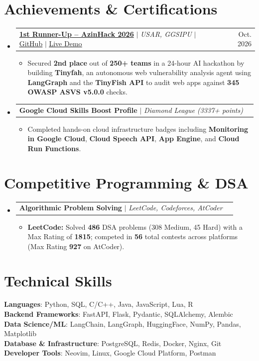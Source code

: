 \documentclass[letterpaper,11pt]{article}
\makeatletter
\newcommand{\resumeItem}[1]{
  \item\small{
    {#1 \vspace{-3pt}}
  }
}
\newcommand{\resumeProjectHeading}[2]{
    \item
    \begin{tabular*}{0.97\textwidth}{l@{\extracolsep{\fill}}r}
      \small#1 & #2 \\
    \end{tabular*}\vspace{-7pt}
}
\newcommand{\resumeSubHeadingListStart}{\begin{itemize}[leftmargin=0.15in, label={}]}
\newcommand{\resumeSubHeadingListEnd}{\end{itemize}}
\newcommand{\resumeItemListStart}{\begin{itemize}}
\newcommand{\resumeItemListEnd}{\end{itemize}\vspace{-6pt}}
\makeatother
\begin{document}
\section{Achievements \& Certifications}
\resumeSubHeadingListStart
\resumeProjectHeading
{\href{https://unstop.com/hackathons/azinhack-2026-university-school-of-automation-robotics-usar-guru-gobind-singh-indraprastha-university-ggsipu--1763832}{\textbf{1st Runner-Up -- AzinHack 2026}} $|$ \emph{USAR, GGSIPU} $|$ \href{https://github.com/Yashvardhan0904/Tinyfah}{\underline{GitHub}} $|$ \href{https://tinyfah.vercel.app/}{\underline{Live Demo}}}{Oct. 2026}
\resumeItemListStart
\resumeItem{Secured \textbf{2nd place} out of \textbf{250+ teams} in a 24-hour AI hackathon by building \textbf{Tinyfah}, an autonomous web vulnerability analysis agent using \textbf{LangGraph} and the \textbf{TinyFish API} to audit web apps against \textbf{345 OWASP ASVS v5.0.0} checks.}
\resumeItemListEnd
\resumeProjectHeading
{\textbf{Google Cloud Skills Boost Profile} $|$ \emph{Diamond League (3337+ points)}}{}
\resumeItemListStart
\resumeItem{Completed hands-on cloud infrastructure badges including \textbf{Monitoring in Google Cloud}, \textbf{Cloud Speech API}, \textbf{App Engine}, and \textbf{Cloud Run Functions}.}
\resumeItemListEnd
\resumeSubHeadingListEnd
\vspace{-14pt}

\section{Competitive Programming \& DSA}
\resumeSubHeadingListStart
\resumeProjectHeading
{\textbf{Algorithmic Problem Solving} $|$ \emph{LeetCode, Codeforces, AtCoder}}{}
\resumeItemListStart
\resumeItem{\textbf{LeetCode:} Solved \textbf{486} DSA problems (308 Medium, 45 Hard) with a Max Rating of \textbf{1815}; competed in \textbf{56} total contests across platforms (Max Rating \textbf{927} on AtCoder).}
\resumeItemListEnd
\resumeSubHeadingListEnd
\vspace{-14pt}

\section{Technical Skills}
\begin{itemize}[leftmargin=0.15in, label={}]
	\small{\item{
	      \textbf{Languages}{: Python, SQL, C/C++, Java, JavaScript, Lua, R} \\
	      \textbf{Backend Frameworks}{: FastAPI, Flask, Pydantic, SQLAlchemy, Alembic} \\
	      \textbf{Data Science/ML}{: LangChain, LangGraph, HuggingFace, NumPy, Pandas, Matplotlib} \\
	      \textbf{Database \& Infrastructure}{: PostgreSQL, Redis, Docker, Nginx, Git} \\
	      \textbf{Developer Tools}{: Neovim, Linux, Google Cloud Platform, Postman}
	      }}
\end{itemize}

\end{document}
